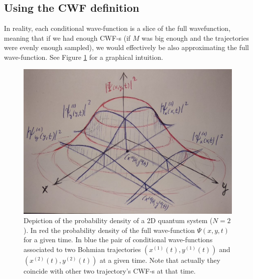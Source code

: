 \documentclass[11pt, a4paper]{article} %
\begin{document}
\subsection{Using the CWF definition}
In reality, each conditional wave-function is a slice of the full wavefunction, meaning that if we had enough CWF-s (if $M$ was big enough and the trajectories were evenly enough sampled), we would effectively be also approximating the full wave-function. See Figure \ref{fig:slices} for a graphical intuition.

\begin{figure}[h!]
  \centering
    \includegraphics[width=0.65\linewidth]{slices.jpg}
  \caption{Depiction of the probability density of a 2D quantum system ($N=2$). In red the probability density of the full wave-function $\Psi(x,y,t)$ for a given time. In blue the pair of conditional wave-functions associated to two Bohmian trajectories $(x^{(1)}(t),y^{(1)}(t))$ and $(x^{(2)}(t),y^{(2)}(t))$ at a given time. Note that actually they coincide with other two trajectory's CWF-s at that time. }
  \label{fig:slices}
\end{figure}
\end{document}
